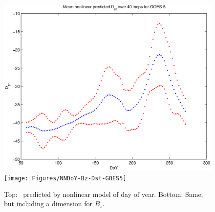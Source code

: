 \begin{figure}[htp!]
	\centering
	\includegraphics[width=0.7\linewidth]{Figures/NNDoY-Dst-GOES5}	
	\texttt{[image: Figures/NNDoY-Bz-Dst-GOES5]}
	\caption{Top: \dst\ predicted by nonlinear model of day of year. Bottom: Same, but including a dimension for $B_z$. }
	\label{fig:DoYDst}
\end{figure}
